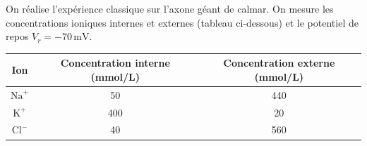 \documentclass[11pt]{article}
\begin{document}
\begin{exercice}
On réalise l'expérience classique sur l'axone géant de calmar. On mesure les concentrations ioniques internes et externes (tableau ci-dessous) et le potentiel de repos $V_r = -70\,\text{mV}$.

\begin{center}
\begin{tabular}{|c|c|c|}\hline
Ion & Concentration interne (mmol/L) & Concentration externe (mmol/L) \\ \hline
$\text{Na}^+$ & 50 & 440 \\ \hline
$\text{K}^+$ & 400 & 20 \\ \hline
$\text{Cl}^-$ & 40 & 560 \\ \hline
\end{tabular}
\end{center}


\end{exercice}
\end{document}
